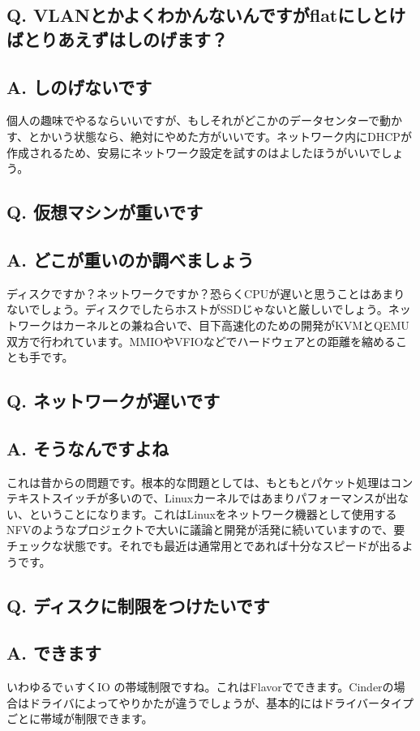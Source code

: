 \documentclass[9pt,b5paper,tombo,openany]{jsbook}
\begin{document}
\subsection*{Q. VLANとかよくわかんないんですがflatにしとけばとりあえずはしのげます？}
\subsection*{A. しのげないです}
個人の趣味でやるならいいですが、もしそれがどこかのデータセンターで動かす、とかいう状態なら、絶対にやめた方がいいです。ネットワーク内にDHCPが作成されるため、安易にネットワーク設定を試すのはよしたほうがいいでしょう。

\subsection*{Q. 仮想マシンが重いです}
\subsection*{A. どこが重いのか調べましょう}
ディスクですか？ネットワークですか？恐らくCPUが遅いと思うことはあまりないでしょう。ディスクでしたらホストがSSDじゃないと厳しいでしょう。ネットワークはカーネルとの兼ね合いで、目下高速化のための開発がKVMとQEMU双方で行われています。MMIOやVFIOなどでハードウェアとの距離を縮めることも手です。

\subsection*{Q. ネットワークが遅いです}
\subsection*{A. そうなんですよね}
これは昔からの問題です。根本的な問題としては、もともとパケット処理はコンテキストスイッチが多いので、Linuxカーネルではあまりパフォーマンスが出ない、ということになります。これはLinuxをネットワーク機器として使用するNFVのようなプロジェクトで大いに議論と開発が活発に続いていますので、要チェックな状態です。それでも最近は通常用とであれば十分なスピードが出るようです。

\subsection*{Q. ディスクに制限をつけたいです}
\subsection*{A. できます}
いわゆるでぃすくIO の帯域制限ですね。これはFlavorでできます。Cinderの場合はドライバによってやりかたが違うでしょうが、基本的にはドライバータイプごとに帯域が制限できます。
\end{document}
